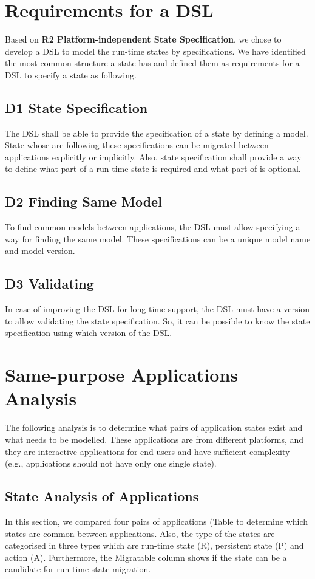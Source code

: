 \section{Requirements for a DSL}
Based on \textbf{R2 Platform-independent State Specification}, we chose to develop a DSL to model the run-time states by specifications. 
We have identified the most common structure a state has and defined them as requirements for a DSL to specify a state as following.


\subsection{D1 State Specification}
The DSL shall be able to provide the specification of a state by defining a model. State whose are following these specifications can be migrated between applications explicitly or implicitly. Also, state specification shall provide a way to define what part of a run-time state is required and what part of is optional.

\subsection{D2 Finding Same Model}
To find common models between applications, the DSL must allow specifying a way for finding the same model. These specifications can be a unique model name and model version.

\subsection{D3 Validating}    
In case of improving the DSL for long-time support, the DSL must have a version to allow validating the state specification. So, it can be possible to know the state specification using which version of the DSL.



\section{Same-purpose Applications Analysis}
The following analysis is to determine what pairs of application states exist and what needs to be modelled.
These applications are from different platforms, and they are interactive applications for end-users and have sufficient complexity (e.g., applications should not have only one single state).


\subsection{State Analysis of Applications}
In this section, we compared four pairs of applications (Table  to determine which states are common between applications. Also, the type of the states are categorised in three types which are run-time state (R), persistent state (P) and action (A). Furthermore, the Migratable column shows if the state can be a candidate for run-time state migration.

